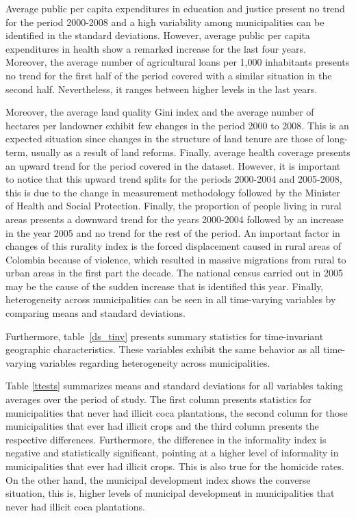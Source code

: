 \documentclass[12pt,a4paper,english]{article}%
\begin{document}
Average public per capita expenditures in education and justice present no trend for the period 2000-2008 and a high variability among municipalities can be identified in the standard deviations. However, average public per capita expenditures in health show a remarked increase for the last four years. Moreover, the average number of agricultural loans per 1,000 inhabitants presents no trend for the first half of the period covered with a similar situation in the second half. Nevertheless, it ranges between higher levels in the last years.

Moreover, the average land quality Gini index and the average number of hectares per landowner exhibit few changes in the period 2000 to 2008. This is an expected situation since changes in the structure of land tenure are those of long-term, usually as a result of land reforms. Finally, average health coverage presents an upward trend for the period covered in the dataset. However, it is important to notice that this upward trend splits for the periods 2000-2004 and 2005-2008, this is due to the change in measurement methodology followed by the Minister of Health and Social Protection. Finally, the proportion of people living in rural areas presents a downward trend for the years 2000-2004 followed by an increase in the year 2005 and no trend for the rest of the period. An important factor in changes of this rurality index is the forced displacement caused in rural areas of Colombia because of violence, which resulted in massive migrations from rural to urban areas in the first part the decade. The national census carried out in 2005 may be the cause of the sudden increase that is identified this year. Finally, heterogeneity across municipalities can be seen in all time-varying variables by comparing means and standard deviations.

Furthermore, table~\ref{ds_tinv} presents summary statistics for time-invariant geographic characteristics. These variables exhibit the same behavior as all time-varying variables regarding heterogeneity across municipalities.

Table \ref{ttests} summarizes means and standard deviations for all variables taking averages over the period of study. The first column presents statistics for municipalities that never had illicit coca plantations, the second column for those municipalities that ever had illicit crops and the third column presents the respective differences. Furthermore, the difference in the informality index is negative and statistically significant, pointing at a higher level of informality in municipalities that ever had illicit crops. This is also true for the homicide rates. On the other hand, the municipal development index shows the converse situation, this is, higher levels of municipal development in municipalities that never had illicit coca plantations.
\end{document}
